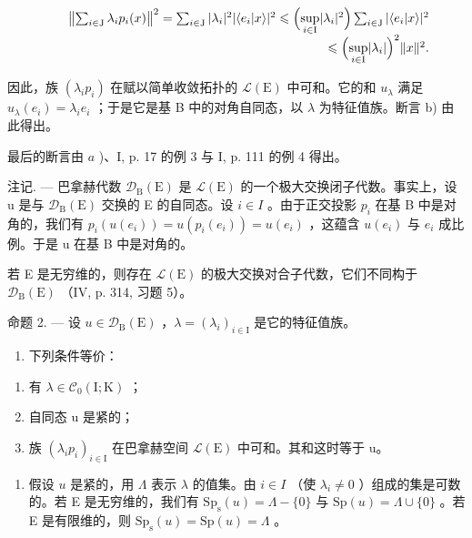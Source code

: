 \[
\begin{array}{r l r} & & {\left\| \sum_ {i \in \mathrm{J}} \lambda_ {i} p _ {i} (x) \right\| ^ {2} = \sum_ {i \in \mathrm{J}} | \lambda_ {i} | ^ {2} | \langle e _ {i} | x \rangle | ^ {2} \leqslant \Bigl (\underset {i \in \mathrm{I}} {\sup} | \lambda_ {i} | ^ {2} \Bigr) \sum_ {i \in \mathrm{J}} | \langle e _ {i} | x \rangle | ^ {2}} \\ & & {\leqslant \Bigl (\underset {i \in \mathrm{I}} {\sup} | \lambda_ {i} | \Bigr) ^ {2} \| x \| ^ {2}.} \end{array}
\]

因此，族 \((\lambda_{i}p_{i})\) 在赋以简单收敛拓扑的 \(\mathcal{L}(\mathrm{E})\) 中可和。它的和 \(u_{\lambda}\) 满足 \(u_{\lambda}(e_{i}) = \lambda_{i}e_{i}\) ；于是它是基 B 中的对角自同态，以 \(\lambda\) 为特征值族。断言 b) 由此得出。

最后的断言由 \(a\) )、I, p. 17 的例 3 与 I, p. 111 的例 4 得出。

注记. --- 巴拿赫代数 \(\mathcal{D}_{\mathrm{B}}(\mathrm{E})\) 是 \(\mathcal{L}(\mathrm{E})\) 的一个极大交换闭子代数。事实上，设 u 是与 \(\mathcal{D}_{\mathrm{B}}(\mathrm{E})\) 交换的 E 的自同态。设 \(i \in I\) 。由于正交投影 \(p_{i}\) 在基 B 中是对角的，我们有 \(p_{i}(u(e_{i})) = u(p_{i}(e_{i})) = u(e_{i})\) ，这蕴含 \(u(e_{i})\) 与 \(e_{i}\) 成比例。于是 u 在基 B 中是对角的。

若 E 是无穷维的，则存在 \(\mathcal{L}(\mathrm{E})\) 的极大交换对合子代数，它们不同构于 \(\mathcal{D}_{\mathrm{B}}(\mathrm{E})\) （IV, p. 314, 习题 5）。

命题 2. --- 设 \(u \in \mathcal{D}_{\mathrm{B}}(\mathrm{E})\) ，\(\lambda = (\lambda_i)_{i \in \mathrm{I}}\) 是它的特征值族。

\begin{enumerate}
\def\labelenumi{\alph{enumi})}
\tightlist
\item
  下列条件等价：
\end{enumerate}

\begin{enumerate}
\def\labelenumi{(\roman{enumi})}
\item
  有 \(\lambda \in \mathcal{C}_{0}(\mathrm{I};\mathrm{K})\) ；
\item
  自同态 u 是紧的；
\item
  族 \((\lambda_{i}p_{i})_{i\in\mathrm{I}}\) 在巴拿赫空间 \(\mathcal{L}(\mathrm{E})\) 中可和。其和这时等于 u。
\end{enumerate}

\begin{enumerate}
\def\labelenumi{\alph{enumi})}
\setcounter{enumi}{1}
\tightlist
\item
  假设 \(u\) 是紧的，用 \(\Lambda\) 表示 \(\lambda\) 的值集。由 \(i \in I\) （使 \(\lambda_i \neq 0\) ）组成的集是可数的。若 E 是无穷维的，我们有 \(\mathrm{Sp}_{\mathrm{s}}(u) = \Lambda - \{0\}\) 与 \(\mathrm{Sp}(u) = \Lambda \cup \{0\}\) 。若 E 是有限维的，则 \(\mathrm{Sp}_{\mathrm{s}}(u) = \mathrm{Sp}(u) = \Lambda\) 。
\end{enumerate}

